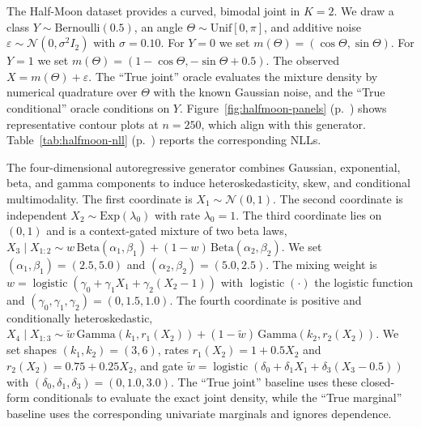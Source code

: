 \documentclass[11pt,a4paper,twoside]{book}\usepackage[]{graphicx}\usepackage[]{xcolor}
\begin{document}
The Half-Moon dataset provides a curved, bimodal joint in $K=2$. We draw a class $Y \sim \mathrm{Bernoulli}(0.5)$, an angle $\Theta \sim \mathrm{Unif}[0,\pi]$, and additive noise $\varepsilon \sim \mathcal{N}(0, \sigma^2 I_2)$ with $\sigma = 0.10$. For $Y = 0$ we set $m(\Theta) = (\cos \Theta, \sin \Theta)$. For $Y = 1$ we set $m(\Theta) = (1 - \cos \Theta, -\sin \Theta + 0.5)$. The observed $X = m(\Theta) + \varepsilon$. The ``True joint'' oracle evaluates the mixture density by numerical quadrature over $\Theta$ with the known Gaussian noise, and the ``True conditional'' oracle conditions on $Y$. Figure~\ref{fig:halfmoon-panels} (p.~\pageref{fig:halfmoon-panels}) shows representative contour plots at $n=250$, which align with this generator. Table~\ref{tab:halfmoon-nll} (p.~\pageref{tab:halfmoon-nll}) reports the corresponding NLLs.

The four-dimensional autoregressive generator combines Gaussian, exponential, beta, and gamma components to induce heteroskedasticity, skew, and conditional multimodality. The first coordinate is $X_1 \sim \mathcal{N}(0,1)$. The second coordinate is independent $X_2 \sim \mathrm{Exp}(\lambda_0)$ with rate $\lambda_0 = 1$. The third coordinate lies on $(0,1)$ and is a context-gated mixture of two beta laws, $X_3 \mid X_{1:2} \sim w\,\mathrm{Beta}(\alpha_1, \beta_1) + (1 - w)\,\mathrm{Beta}(\alpha_2, \beta_2)$. We set $(\alpha_1, \beta_1) = (2.5, 5.0)$ and $(\alpha_2, \beta_2) = (5.0, 2.5)$. The mixing weight is $w = \operatorname{logistic}(\gamma_0 + \gamma_1 X_1 + \gamma_2(X_2 - 1))$ with $\operatorname{logistic}(\cdot)$ the logistic function and $(\gamma_0, \gamma_1, \gamma_2) = (0, 1.5, 1.0)$. The fourth coordinate is positive and conditionally heteroskedastic, $X_4 \mid X_{1:3} \sim \tilde{w}\,\mathrm{Gamma}(k_1, r_1(X_2)) + (1 - \tilde{w})\,\mathrm{Gamma}(k_2, r_2(X_2))$. We set shapes $(k_1, k_2) = (3, 6)$, rates $r_1(X_2) = 1 + 0.5 X_2$ and $r_2(X_2) = 0.75 + 0.25 X_2$, and gate $\tilde{w} = \operatorname{logistic}(\delta_0 + \delta_1 X_1 + \delta_3(X_3 - 0.5))$ with $(\delta_0, \delta_1, \delta_3) = (0, 1.0, 3.0)$. The ``True joint'' baseline uses these closed-form conditionals to evaluate the exact joint density, while the ``True marginal'' baseline uses the corresponding univariate marginals and ignores dependence.
\end{document}
